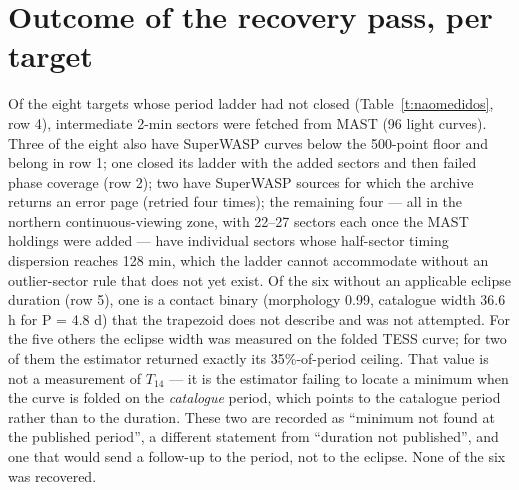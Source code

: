 \documentclass{aa}
\begin{document}
\appendix

\section{Outcome of the recovery pass, per target}\label{a:A}
Of the eight targets whose period ladder had not closed (Table~\ref{t:naomedidos}, row 4), intermediate 2-min sectors were fetched from MAST (96 light curves). Three of the eight also have SuperWASP curves below the 500-point floor and belong in row 1; one closed its ladder with the added sectors and then failed phase coverage (row 2); two have SuperWASP sources for which the archive returns an error page (retried four times); the remaining four --- all in the northern continuous-viewing zone, with 22--27 sectors each once the MAST holdings were added --- have individual sectors whose half-sector timing dispersion reaches 128 min, which the ladder cannot accommodate without an outlier-sector rule that does not yet exist.
Of the six without an applicable eclipse duration (row 5), one is a contact binary (morphology 0.99, catalogue width 36.6 h for P = 4.8 d) that the trapezoid does not describe and was not attempted. For the five others the eclipse width was measured on the folded TESS curve; for two of them the estimator returned exactly its 35\%-of-period ceiling. That value is not a measurement of $T_{14}$ --- it is the estimator failing to locate a minimum when the curve is folded on the \emph{catalogue} period, which points to the catalogue period rather than to the duration. These two are recorded as ``minimum not found at the published period'', a different statement from ``duration not published'', and one that would send a follow-up to the period, not to the eclipse. None of the six was recovered.
\end{document}
